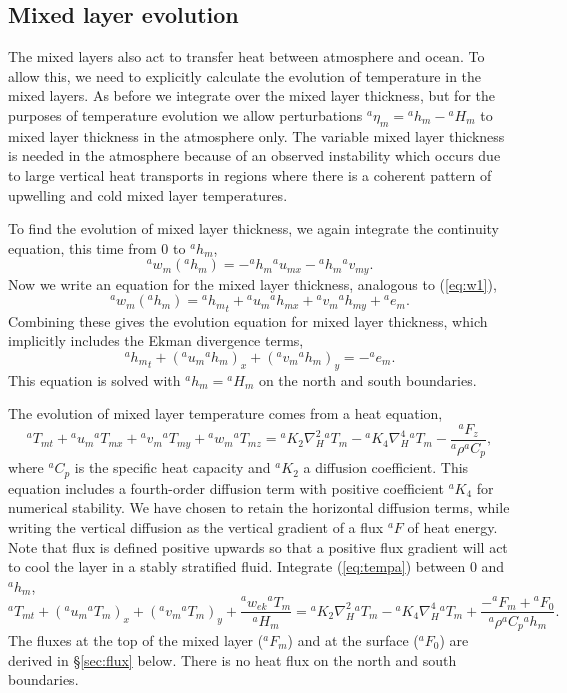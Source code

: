 \documentclass[11pt, a4paper,twoside]{article}
\newcommand{\etb}[2]{{{}^{#1}\eta_{#2}}}
\newcommand{\rhb}[1]{{{}^{#1}\rho}}
\newcommand{\cp}[1]{{{}^{#1}C_p}}
\newcommand{\uu}[2]{{{}^{#1}u_{#2}}}
\newcommand{\vv}[2]{{{}^{#1}v_{#2}}}
\newcommand{\ww}[2]{{{}^{#1}w_{#2}}}
\newcommand{\ek}[1]{{{}^{#1}w_{ek}}}
\newcommand{\HH}[2]{{{}^{#1}H_{#2}}}
\newcommand{\kh}[1]{{{}^{#1}K_2}}
\newcommand{\kf}[1]{{{}^{#1}K_4}}
\newcommand{\e}[2]{{{}^{#1}e_{#2}}}
\newcommand{\h}[2]{{{}^{#1}h_{#2}}}
\newcommand{\T}[2]{{{}^{#1}T_{#2}}}
\newcommand{\F}[3]{{{}^{#1}F^{#3}_{#2}}}
\numberwithin{equation}{section}
\begin{document}
\subsection{Mixed layer evolution}
The mixed layers also act to transfer heat between atmosphere and ocean.
To allow this, we need to explicitly calculate the evolution of temperature in the mixed layers.
As before we integrate over the mixed layer thickness,  but for the purposes of temperature evolution we allow perturbations $\etb{a}{m} = \h{a}{m} - \HH{a}{m} $ to mixed layer thickness in the atmosphere only.
The variable mixed layer thickness is needed in the atmosphere because of an observed instability which occurs due to large vertical heat transports in regions where there is a coherent pattern of upwelling and cold mixed layer temperatures.

To find the evolution of mixed layer thickness, we again integrate the continuity equation, this time from $0$ to $\h{a}{m}$,
\begin{equation}\ww{a}{m}(\h{a}{m}) = - \h{a}{m}\uu{a}{mx} - \h{a}{m}\vv{a}{my}.\end{equation}
Now we write an equation for the mixed layer thickness, analogous to (\ref{eq:w1}),
\begin{equation}\label{eq:w0a}
\ww{a}{m}(\h{a}{m}) = \h{a}{m}_t + \uu{a}{m}\h{a}{mx} + \vv{a}{m} \h{a}{my}  + \e{a}{m}.
\end{equation}
Combining these gives the evolution equation for mixed layer thickness, which implicitly includes the Ekman divergence terms,
\begin{equation}\label{eq:hevmat}
\h{a}{m}_t + (\uu{a}{m}\h{a}{m})_x + (\vv{a}{m} \h{a}{m})_y =   - \e{a}{m}.
\end{equation}
This equation is solved with $\h{a}{m} = \HH{a}{m}$ on the north and south boundaries.

The evolution of mixed layer temperature comes from a heat equation,
\begin{equation}\label{eq:tempa}
\T{a}{mt} + \uu{a}{m} \T{a}{mx} + \vv{a}{m} \T{a}{my} + \ww{a}{m} \T{a}{mz} =  \kh{a} \nabla_H^2 \T{a}{m} - \kf{a}\nabla_H^4\T{a}{m} - \frac{{}^aF_z}{\rhb{a} \cp{a}},
\end{equation}
where $\cp{a}$ is the specific heat capacity and $\kh{a}$ a diffusion coefficient.
This equation includes a fourth-order diffusion term with positive coefficient $\kf{a}$ for numerical stability.
We have chosen to retain the horizontal diffusion terms, while writing the vertical diffusion as the vertical gradient of a flux ${}^aF$ of heat energy.
Note that flux is defined positive upwards so that a positive flux gradient will act to cool the layer in a stably stratified fluid.
Integrate (\ref{eq:tempa}) between $0$ and $\h{a}{m}$, \begin{equation}\label{eq:tempc}
\T{a}{mt} + (\uu{a}{m} \T{a}{m})_x + (\vv{a}{m} \T{a}{m})_y + \frac{\ek{a}\T{a}{m}}{\HH{a}{m}}  =  \kh{a} \nabla_H^2 \T{a}{m} - \kf{a}\nabla_H^4\T{a}{m}+ \frac{-\F{a}{m}{} + \F{a}{0}{}}{\rhb{a} \cp{a} \h{a}{m}}.
\end{equation}
The fluxes at the top of the mixed layer ($\F{a}{m}{}$) and at the surface ($\F{a}{0}{}$) are derived in \S \ref{sec:flux} below.
There is no heat flux on the north and south boundaries.
\end{document}
